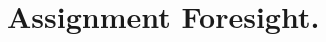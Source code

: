 \documentclass[12pt]{article}
\begin{document}


  


\section{Assignment Foresight.}
\end{document}
